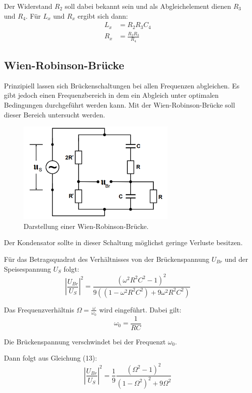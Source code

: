 Der Widerstand $R_2$ soll dabei bekannt sein und als Abgleichelement dienen $R_3$ und $R_4$.
Für $L_x$ und $R_x$ ergibt sich dann:
\begin{align}
  L_x &= R_2 R_3 C_4 \\
  R_x &= \frac{R_2 R_3}{R_4}
\end{align}


\subsection{Wien-Robinson-Brücke}
Prinzipiell lassen sich Brückenschaltungen bei allen Frequenzen abgleichen. Es gibt jedoch einen
Frequenzbereich in dem ein Abgleich unter optimalen Bedingungen durchgeführt werden kann. Mit der
Wien-Robinson-Brücke soll dieser Bereich untersucht werden.

\begin{figure}[H]
  \centering
  \includegraphics[height=5cm]{wien.PNG}
  \caption{Darstellung einer Wien-Robinson-Brücke. \cite{sample}}
  \label{fig:wien}
\end{figure}
Der Kondensator sollte in dieser Schaltung möglichst geringe Verluste besitzen.

Für das Betragsquadrat des Verhältnisses von der Brückenspannung $U_{Br}$ und der Speisespannung $U_S$ folgt:
\begin{equation}
  \left|\frac{U_{Br}}{U_S} \right|^2 = \frac{(\omega^2 R^2 C^2 -1)^2}{9((1- \omega^2 R^2 C^2) + 9 \omega^2 R^2 C^2)}
\end{equation}

Das Frequenzverhältnis $\Omega = \frac{\omega}{\omega_0}$ wird eingeführt. Dabei gilt:
\begin{equation}
  \omega_0 = \frac{1}{RC}
\end{equation}

Die Brückenspannung verschwindet bei der Frequenzt $\omega_0$.

Dann folgt aus Gleichung (13):
\begin{equation}
  \left|\frac{U_{Br}}{U_S} \right|^2 = \frac{1}{9} \frac{(\Omega^2 -1)^2}{(1- \Omega^2)^2 + 9 \Omega^2}
\end{equation}

